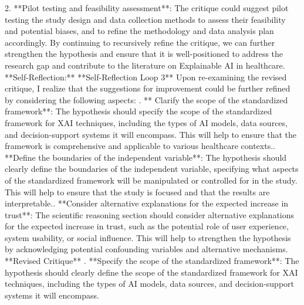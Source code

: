 \documentclass{article}%
\begin{document}
2. **Pilot testing and feasibility assessment**: The critique could suggest pilot testing the study design and data collection methods to assess their feasibility and potential biases, and to refine the methodology and data analysis plan accordingly.\newline%
\newline%
By continuing to recursively refine the critique, we can further strengthen the hypothesis and ensure that it is well{-}positioned to address the research gap and contribute to the literature on Explainable AI in healthcare.\newline%
\newline%
**Self{-}Reflection:**\newline%
**Self{-}Reflection Loop 3**\newline%
\newline%
Upon re{-}examining the revised critique, I realize that the suggestions for improvement could be further refined by considering the following aspects:\newline%
. ** Clarify the scope of the standardized framework**: The hypothesis should specify the scope of the standardized framework for XAI techniques, including the types of AI models, data sources, and decision{-}support systems it will encompass. This will help to ensure that the framework is comprehensive and applicable to various healthcare contexts.. **Define the boundaries of the independent variable**: The hypothesis should clearly define the boundaries of the independent variable, specifying what aspects of the standardized framework will be manipulated or controlled for in the study. This will help to ensure that the study is focused and that the results are interpretable.. **Consider alternative explanations for the expected increase in trust**: The scientific reasoning section should consider alternative explanations for the expected increase in trust, such as the potential role of user experience, system usability, or social influence. This will help to strengthen the hypothesis by acknowledging potential confounding variables and alternative mechanisms.\newline%
\newline%
**Revised Critique**\newline%
. **Specify the scope of the standardized framework**: The hypothesis should clearly define the scope of the standardized framework for XAI techniques, including the types of AI models, data sources, and decision{-}support systems it will encompass.\newline%
\end{document}
